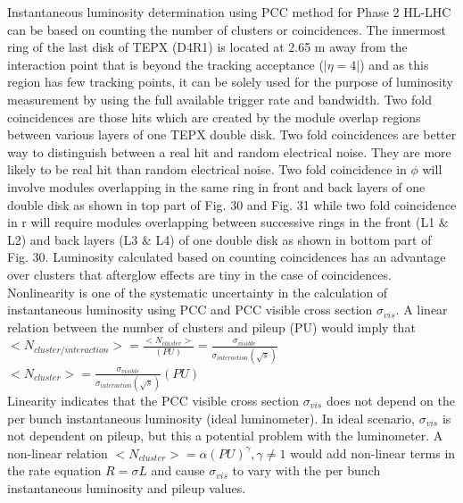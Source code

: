 Instantaneous luminosity determination using PCC method for Phase 2 HL-LHC can be based on counting the number of clusters or coincidences. The innermost ring of the last disk of TEPX (D4R1) is located at 2.65 m away from the interaction point that is beyond the tracking acceptance ($|\eta = 4|$) and as this region has few tracking points, it can be solely used for the purpose of luminosity measurement by using the full available trigger rate and bandwidth.  Two fold coincidences are those hits which are created by the module overlap regions between various layers of one TEPX double disk. Two fold coincidences are better way to distinguish between a real hit and random electrical noise. They are more likely to be real hit than random electrical noise. Two fold coincidence in $\phi$ will involve modules overlapping in the same ring in front and back layers of one double disk as shown in top part of Fig. 30 and Fig. 31 while two fold coincidence in r will require modules overlapping between successive rings in the front (L1 $\&$ L2) and back layers (L3 $\&$ L4) of one double disk as shown in bottom part of Fig. 30. Luminosity calculated based on counting coincidences has an advantage over clusters that afterglow effects are tiny in the case of coincidences. \\


Nonlinearity is one of the systematic uncertainty in the calculation of instantaneous luminosity using PCC and PCC visible cross section $\sigma_{vis}$. A linear relation between the number of clusters and pileup (PU) would imply that\\

$<N_{cluster/interaction}> = \frac{<N_{cluster}>}{(PU)} = \frac{\sigma_{visible}}{\sigma_{interaction} (\sqrt{s})}$ \\

$<N_{cluster}> =  \frac{\sigma_{visible}}{\sigma_{interaction}(\sqrt{s})} (PU)$ \\

\newpage Linearity indicates that the PCC visible cross section $\sigma_{vis}$ does not depend on the per bunch instantaneous luminosity (ideal luminometer). In ideal  scenario, $\sigma_{vis}$ is not dependent on pileup, but this a potential problem with the luminometer. A non-linear relation $<N_{cluster}> = \alpha (PU)^{\gamma}, \gamma \neq 1$ would add non-linear terms in the rate equation $R = \sigma L$  and cause $\sigma_{vis}$ to vary with the per bunch instantaneous luminosity and pileup values.


